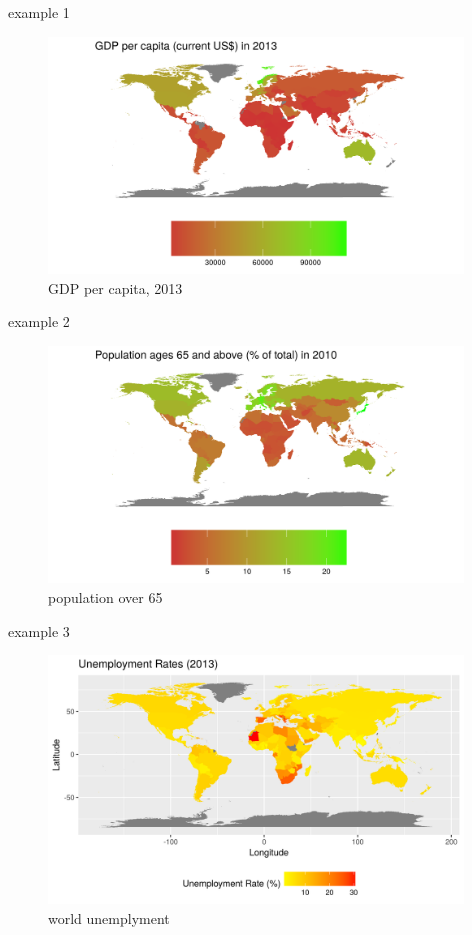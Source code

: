 \documentclass{beamer}
\begin{document}
\begin{frame}{example 1}
	\begin{figure}
		\centering
		\includegraphics[width=11cm]{GDP.png}
		\caption[GDP per capita, 2013]{GDP per capita, 2013}
	\end{figure}
		
\end{frame}
\begin{frame}{example 2}
	\begin{figure}
		\centering
		\includegraphics[width=11cm]{ageing.png}
		\caption[population over 65]{population over 65}
	\end{figure}
\end{frame}

\begin{frame}{example 3}
	\begin{figure}
		\centering
		\includegraphics[width=11cm]{unemploy.png}
		\caption[world unemplyment]{world unemplyment}
	\end{figure}
\end{frame}
\end{document}
